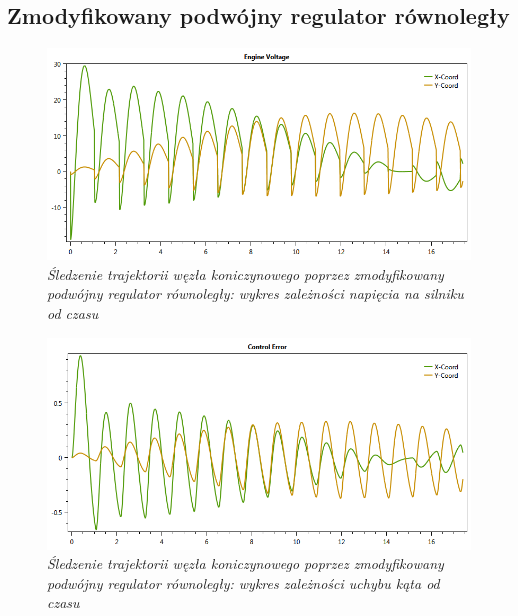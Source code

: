 \documentclass[12pt, twoside, openany]{report}
\theoremstyle{definition}
\begin{document}
\begin{appendices}
\section{Zmodyfikowany podwójny regulator równoległy}
\begin{figure}[H]
	\centering
		\includegraphics[width = 400pt]{TrefoilKnotPDEV} 
		\caption{\textit{Śledzenie trajektorii węzła koniczynowego poprzez zmodyfikowany podwójny regulator równoległy: wykres zależności napięcia na silniku od czasu}}
		\label{plot:TrefoilKnotPDEV}
\end{figure}

\begin{figure}[H]
	\centering
		\includegraphics[width = 400pt]{TrefoilKnotPDCE} 
		\caption{\textit{Śledzenie trajektorii węzła koniczynowego poprzez zmodyfikowany podwójny regulator równoległy: wykres zależności uchybu kąta od czasu}}
		\label{plot:TrefoilKnotPDCE}
\end{figure}


\end{appendices}
\end{document}
